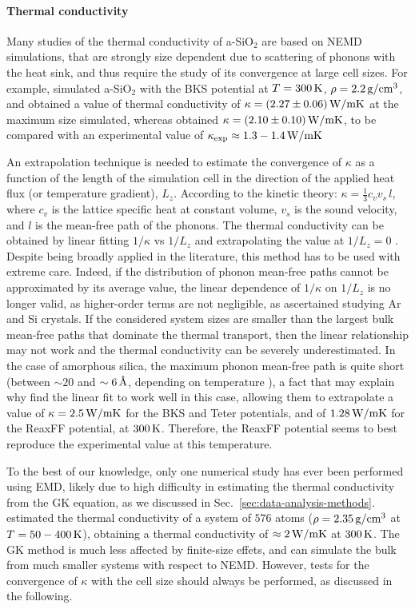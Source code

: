 \paragraph{Thermal conductivity}
Many studies of the thermal conductivity of a-SiO$_2$ are based on NEMD simulations, that are strongly size dependent due to scattering of phonons with the heat sink, and thus require the study of its convergence at large cell sizes. 
For example, \citet{Tian2017} simulated a-SiO$_2$ with the BKS potential at $T=300\,\mathrm{K}$, $\rho=2.2\,\mathrm{g/cm^3}$, and obtained a value of thermal conductivity of $\kappa=(2.27 \pm 0.06)\,\mathrm{W/mK}$ at the maximum size simulated, whereas \citet{Coquil2011} obtained $\kappa= (2.10 \pm 0.10)\,\mathrm{W/mK}$, to be compared with an experimental value of $\kappa_\mathrm{exp}\approx 1.3 - 1.4 \,\mathrm{W/mK}$

An extrapolation technique is needed to estimate the convergence of $\kappa$ as a function of the length of the simulation cell in the direction of the applied heat flux (or temperature gradient), $L_z$. According to the kinetic theory: $\kappa = \frac{1}{3} c_v v_s \,l$, where $c_v$ is the lattice specific heat at constant volume, $v_s$ is the sound velocity, and $l$ is the mean-free path of the phonons. The thermal conductivity can be obtained by linear fitting $1/\kappa$ vs $1/L_z$ and extrapolating the value at $1/L_z=0$ \cite{Schelling2002}. 
Despite being broadly applied in the literature, this method has to be used with extreme care. Indeed, if the distribution of phonon mean-free paths cannot be approximated by its average value, the linear dependence of $1/\kappa$ on $1/L_z$ is no longer valid, as higher-order terms are not negligible, as \citet{Sellan2010} ascertained studying Ar and Si crystals. If the considered system sizes are smaller than the largest bulk mean-free paths that dominate the thermal transport, then the linear relationship may not work and the thermal conductivity can be severely underestimated. 
In the case of amorphous silica, the maximum phonon mean-free path is quite short (between $\sim 20$ and $\sim 6\,\mathrm{{\mbox{\AA}}}$, depending on temperature \cite{Yu2006}), a fact that may explain why \citet{Tian2017} find the linear fit to work well in this case, allowing them to extrapolate a value of $\kappa=2.5\,\mathrm{W/mK}$ for the BKS and Teter potentials, and of $1.28\,\mathrm{W/mK}$ for the ReaxFF potential, at $300\,\mathrm{K}$. Therefore, the ReaxFF potential seems to best reproduce the experimental value at this temperature. 

To the best of our knowledge, only one numerical study has ever been performed using EMD, likely due to high difficulty in estimating the thermal conductivity from the GK equation, as we discussed in Sec.~\ref{sec:data-analysis-methods}.
\citet{McGaughey2004b} estimated the thermal conductivity of a system of $576$ atoms ($\rho=2.35\,\mathrm{g/cm^3}$ at $T = 50-400 \,\mathrm{K}$), obtaining a thermal conductivity of $\approx 2\,\mathrm{W/mK}$ at $300\,\mathrm{K}$. 
The GK method is much less affected by finite-size effets, and can simulate the bulk from much smaller systems with respect to NEMD. However, tests for the convergence of $\kappa$ with the cell size should always be performed, as discussed in the following. 


